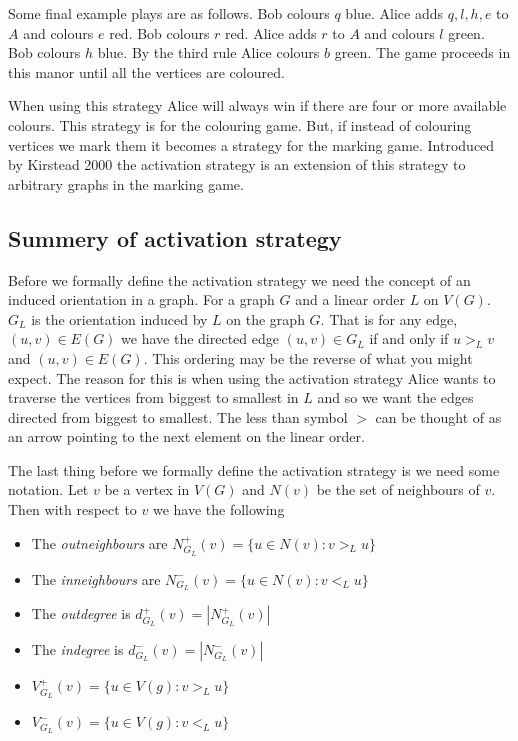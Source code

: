 %
Some final example plays are as follows. Bob colours $q$ blue. Alice adds $q,l,h,e$ to $A$ and colours $e$ red. Bob colours $r$ red. Alice adds $r$ to $A$ and colours $l$ green. Bob colours $h$ blue. By the third rule Alice colours $b$ green. The game proceeds in this manor until all the vertices are coloured. 

When using this strategy Alice will always win if there are four or more available colours. This strategy is for the colouring game. But, if instead of colouring vertices we mark them it becomes a strategy for the marking game. Introduced by Kirstead 2000 \cite{KIERSTEAD2000} the activation strategy is an extension of this strategy to arbitrary graphs in the marking game. 
 
\subsection{Summery of activation strategy}
%
Before we formally define the activation strategy we need the concept of an induced orientation in a graph. For a graph $G$ and a linear order $L$ on $V(G)$. $G_L$ is the orientation induced by $L$ on the graph $G$. That is for any edge, $(u,v)\in E(G)$ we have the directed edge $(u,v)\in G_L$ if and only if $u>_Lv$ and $(u,v)\in E(G)$. This ordering may be the reverse of what you might expect. The reason for this is when using the activation strategy Alice wants to traverse the vertices from biggest to smallest in $L$ and so we want the edges directed from biggest to smallest. The less than symbol $>$ can be thought of as an arrow pointing to the next element on the linear order.

The last thing before we formally define the activation strategy is we need some notation. Let $v$ be a vertex in $V(G)$ and $N(v)$ be the set of neighbours of $v$. Then with respect to $v$ we have the following
\begin{itemize}        
    \item The \textit{outneighbours} are $N^+_{G_L}(v)=\{u\in N(v):v>_L u\}$ 
    \item The \textit{inneighbours} are $N^-_{G_L}(v)=\{u\in N(v):v<_L u\}$ 
    \item The \textit{outdegree} is $d^+_{G_L}(v)=|N^+_{G_L}(v)|$ 
    \item The \textit{indegree} is $d^-_{G_L}(v)=|N^-_{G_L}(v)|$
    \item $V^+_{G_L}(v)=\{u\in V(g):v>_L u\}$     
    \item $V^-_{G_L}(v)=\{u\in V(g):v<_L u\}$ 
\end{itemize}

